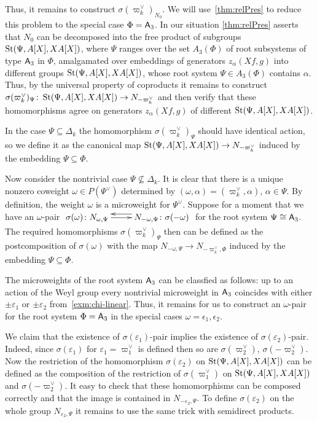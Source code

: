 Thus, it remains to construct $\sigma({\varpi_k^\vee})_{N_0}$.
We will use~\cref{thm:relPres} to reduce this problem to the special case $\Phi = \mathsf{A}_3$.
In our situation \cref{thm:relPres} asserts that $N_0$ can be decomposed into the free product of subgroups $\operatorname{St}(\Psi, A[X], XA[X])$,
 where $\Psi$ ranges over the set $A_3(\Phi)$ of root subsystems of type $\mathsf{A}_3$ in $\Phi$, amalgamated over embeddings of generators $z_\alpha(Xf, g)$ into different groups $\operatorname{St}(\Psi, A[X], XA[X])$, whose root system $\Psi \in A_3(\Phi)$ contains $\alpha$.
Thus, by the universal property of coproducts it remains to construct $\sigma(\varpi_k^\vee)_\Psi \colon \operatorname{St}(\Psi, A[X], XA[X]) \to N_{-\varpi_k^\vee}$ and then
  verify that these homomorphisms agree on generators $z_\alpha(Xf, g)$ of different $\operatorname{St}(\Psi, A[X], XA[X])$.

In the case $\Psi \subseteq \Delta_k$ the homomorphism $\sigma(\varpi_k^\vee)_\Psi$ should have identical action, so we define it as the canonical map $\operatorname{St}(\Psi, A[X], XA[X]) \to N_{-\varpi_k^\vee}$
induced by the embedding $\Psi \subseteq \Phi$.

Now consider the nontrivial case $\Psi \not\subseteq \Delta_k$.
It is clear that there is a unique nonzero coweight $\omega \in P(\Psi^\vee)$ determined by $(\omega, \alpha) = (\varpi_k^\vee, \alpha)$, $\alpha \in \Psi$.
By definition, the weight $\omega$ is a microweight for $\Psi^\vee$.
Suppose for a moment that we have an $\omega$-pair $\xymatrix{ \sigma(\omega)\colon N_{\omega, \Psi} \ar[r] & \ar@<-1.0ex>[l] N_{-\omega, \Psi}\colon \sigma(-\omega) }$ for the root system $\Psi\cong \mathsf{A}_3$.
The required homomorphisms $\sigma(\varpi_k^\vee)_\Psi$ then can be defined as the postcomposition of $\sigma(\omega)$ with the map $N_{-\omega, \Psi} \to N_{-\varpi_k^\vee, \Phi}$ induced by the embedding $\Psi \subseteq \Phi$.

The microweights of the root system $\mathsf{A}_3$ can be classfied as follows: up to an action of the Weyl group every nontrivial microweight in $\mathsf{A}_3$ coincides with either $\pm\varepsilon_1$ or $\pm\varepsilon_2$ from~\cref{exm:chi-linear}.
Thus, it remains for us to construct an $\omega$-pair for the root system $\Phi=\mathsf{A}_3$ in the special cases $\omega = \epsilon_1, \epsilon_2$.

We claim that the existence of $\sigma(\varepsilon_1)$-pair implies the existence of $\sigma(\varepsilon_2)$-pair.
Indeed, since $\sigma(\varepsilon_1)$ for $\varepsilon_1 = \varpi_1^\vee$ is defined then so are $\sigma(\varpi_2^\vee)$, $\sigma(-\varpi_2^\vee)$.
Now the restriction of the homomorphism $\sigma(\varepsilon_2)$ on $\operatorname{St}(\Psi, A[X], XA[X])$ can be defined as the composition of the restriction of $\sigma(\varpi_1^\vee)$ on $\operatorname{St}(\Psi, A[X], XA[X])$ and $\sigma(-\varpi_2^\vee)$.
It easy to check that these homomorphisms can be composed correctly and that the image is contained in $N_{-\varepsilon_2, \Psi}$.
To define $\sigma(\varepsilon_2)$ on the whole group $N_{\varepsilon_2, \Psi}$ it remains to use the same trick with semidirect products.

